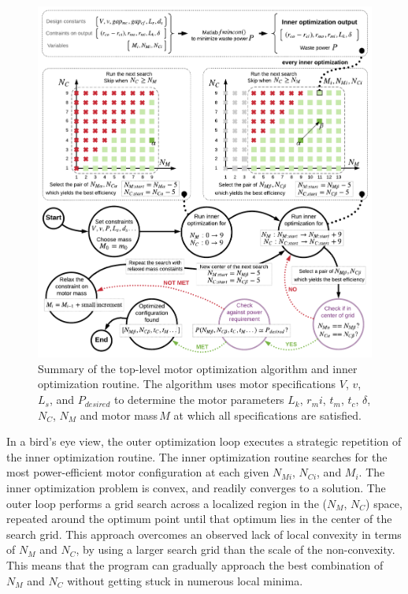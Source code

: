     \begin{figure}[h]
        \centering
        \includegraphics[width=5.8in]{chap5/images/optimization_illustration.pdf}
        \caption{Summary of the top-level motor optimization algorithm and inner optimization routine. The algorithm uses motor specifications $V$, $v$, $L_s$, and $P_{desired}$ to determine the motor parameters $L_k$, $r_mi$, $t_m$, $t_c$, $\delta$, $N_C$, $N_M$ and motor mass\,$M$ at which all specifications are satisfied.}
        \label{fig:chap/experiment/optimization/illustraion of algo}
    \end{figure}
    
    
    In a bird's eye view, the outer optimization loop executes a strategic repetition of the inner optimization routine. The inner optimization routine searches for the most power-efficient motor configuration at each given $N_{Mi}$, $N_{Ci}$, and $M_i$. The inner optimization problem is convex, and readily converges to a solution. The outer loop performs a grid search across a localized region in the ($N_M$, $N_C$) space, repeated around the optimum point until that optimum lies in the center of the search grid. This approach overcomes an observed lack of local convexity in terms of $N_M$ and $N_C$, by using a larger search grid than the scale of the non-convexity. This means that the program can gradually approach the best combination of $N_M$ and $N_C$ without getting stuck in numerous local minima. 
    
